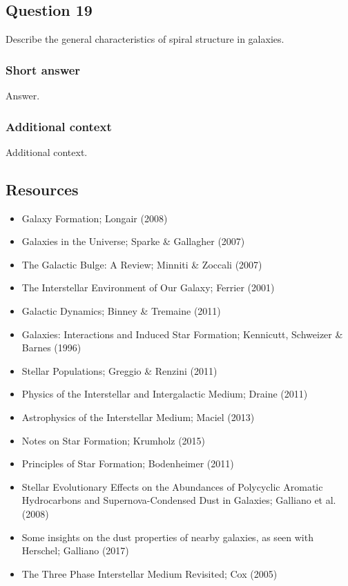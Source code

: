 \documentclass[a4paper,10pt]{article}
\begin{document}

\newpage
\subsection{Question 19}

Describe the general characteristics of spiral structure in galaxies.

\subsubsection{Short answer}

Answer.

\subsubsection{Additional context}

Additional context.


\newpage
\subsection{Resources}

\begin{itemize}
    \item Galaxy Formation; Longair (2008)
    \item Galaxies in the Universe; Sparke \& Gallagher (2007)
    \item The Galactic Bulge: A Review; Minniti \& Zoccali (2007)
    \item The Interstellar Environment of Our Galaxy; Ferrier (2001)
    \item Galactic Dynamics; Binney \& Tremaine (2011)
    \item Galaxies: Interactions and Induced Star Formation; Kennicutt, Schweizer \& Barnes (1996)
    \item Stellar Populations; Greggio \& Renzini (2011)
    \item Physics of the Interstellar and Intergalactic Medium; Draine (2011)
    \item Astrophysics of the Interstellar Medium; Maciel (2013)
    \item Notes on Star Formation; Krumholz (2015)
    \item Principles of Star Formation; Bodenheimer (2011)
    \item Stellar Evolutionary Effects on the Abundances of Polycyclic Aromatic Hydrocarbons and Supernova-Condensed Dust in Galaxies; Galliano et al. (2008)
    \item Some insights on the dust properties of nearby galaxies, as seen with Herschel; Galliano (2017)
    \item The Three Phase Interstellar Medium Revisited; Cox (2005)
\end{itemize}
\end{document}
